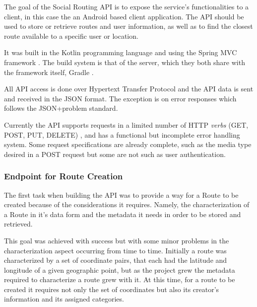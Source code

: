 \documentclass{article}
\begin{document}
            The goal of the Social Routing API is to expose the service's functionalities to a client, in this case the an Android\cite{androiddocs} based client application. The API
            should be used to store or retrieve routes and user information, as well as to find the closest route available to a specific user or location.\par
            It was built in the Kotlin \cite{kotlinwebsite} programming language and using the {Spring MVC framework} \cite{springwebsite}. The build system is that of the server,
            which they both share with the framework itself, Gradle \cite{gradlewebsite}. \par 
            All API access is done over Hypertext Transfer Protocol and the API data is sent and received in the JSON \cite{jsonwebsite} format. The exception is on error responses
            which follows the JSON+problem \cite{jsonproblemonlinedocs} standard. \par
            Currently the API supports requests in a limited number of HTTP \textit{verbs} (GET, POST, PUT, DELETE) \cite{apihttpverbsdocs}, and has a functional but incomplete error handling system. 
            Some request specifications are already complete, such as the media type desired in a POST request but some are not such as user authentication. 

            \subsubsection*{Endpoint for Route Creation}
            The first task when building the API was to provide a way for a Route to be created because of the considerations it requires. Namely, the 
            characterization of a Route in it's data form and the metadata it needs in order to be stored and retrieved.\par
            
            This goal was achieved with success \cite{routecreationdocs} but with some minor problems in the characterization aspect occurring from time to time. 
            Initially a route was characterized by a set of coordinate pairs, that each had the latitude and longitude of a given geographic point, but 
            as the project grew the metadata required to characterize a route grew with it. At this time, for a route to be created it requires not only the 
            set of coordinates but also its creator's information and its assigned categories.
\end{document}
